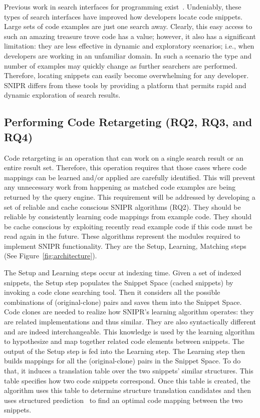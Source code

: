 \documentclass[conference]{IEEEtran}
\begin{document}
Previous work in search interfaces for programming exist~\cite{Brandt:2010tp, Bajracharya:2006vn, Sahavechaphan:2006tc, Bajracharya:2010um, Hummel:eq, Reiss:2009fu}. Undeniably, these types of search interfaces have improved how developers locate code snippets. Large sets of code examples are just one search away. Clearly, this easy access to such an amazing treasure trove code has a value; however, it also has a significant limitation: they are less effective in dynamic and exploratory scenarios; i.e., when developers are working in an unfamiliar domain. In such a scenario the type and number of examples may quickly change as further searchers are performed. Therefore, locating snippets can easily become overwhelming for any developer. \uppercase{SnipR} differs from these tools by providing a platform that permits rapid and dynamic exploration of search results. 


\subsection{Performing Code Retargeting (RQ2, RQ3, and RQ4)}
\label{sec:restqs}

Code retargeting is an operation that can work on a single search result or an entire result set. Therefore, this operation requires that those cases where code mappings can be learned and/or applied are carefully identified. This will prevent any unnecessary work from happening as matched code examples are being returned by the query engine. This requirement will be addressed by developing a set of reliable and cache conscious \uppercase{SnipR} algorithms (RQ2). They should be reliable by consistently learning code mappings from example code. They should be cache conscious by exploiting recently read example code if this code must be read again in the future. These algorithms represent the modules required to implement SNIPR functionality. They are the Setup, Learning, Matching steps (See Figure~\ref{fig:architecture}).

The Setup and Learning steps occur at indexing time. Given a set of indexed snippets, the Setup step populates the Snippet Space (cached snippets) by invoking a code clone searching tool. Then it considers all the possible combinations of (original-clone) pairs and saves them into the Snippet Space. Code clones are needed to realize how \uppercase{SnipR}’s learning algorithm operates: they are related implementations and thus similar. They are also syntactically different and are indeed interchangeable. This knowledge is used by the learning algorithm to hypothesize and map together related code elements between snippets. The output of the Setup step is fed into the Learning step. The Learning step then builds mappings for all the (original-clone) pairs in the Snippet Space. To do that, it induces a translation table over the two snippets' similar structures. This table specifies how two code snippets correspond. Once this table is created, the algorithm uses this table to determine structure translation candidates and then uses structured prediction~\cite{Collins:2002uo} to find an optimal code mapping between the two snippets. 
\end{document}
